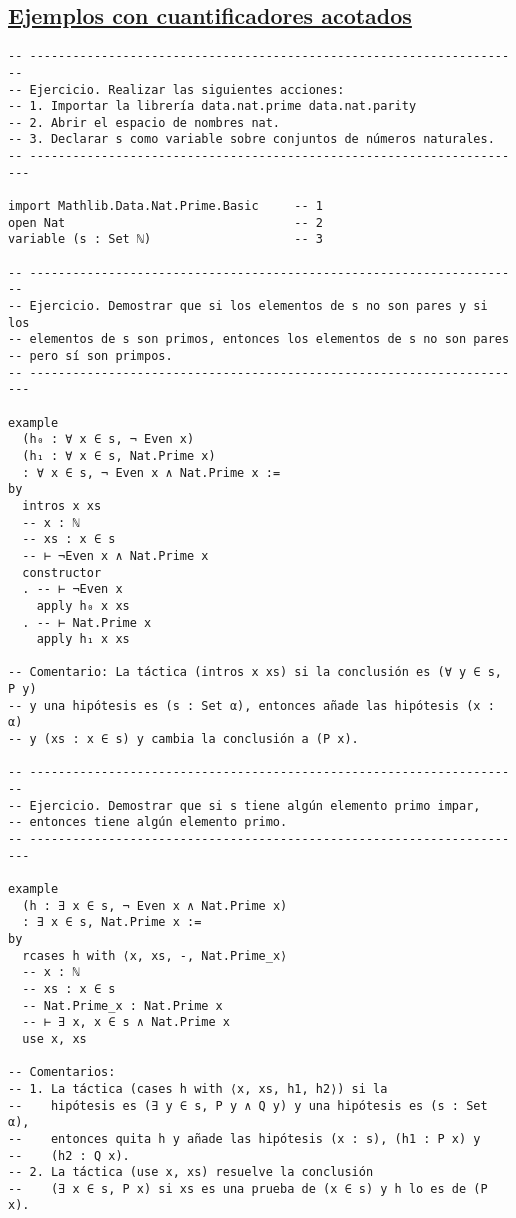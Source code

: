 \subsection{\href{./src/Conjuntos/Ejemplos\_con\_cuantificadores\_acotados.lean}{Ejemplos con cuantificadores acotados}}
\label{sec:org1ac78ed}
\begin{verbatim}
-- ---------------------------------------------------------------------
-- Ejercicio. Realizar las siguientes acciones:
-- 1. Importar la librería data.nat.prime data.nat.parity
-- 2. Abrir el espacio de nombres nat.
-- 3. Declarar s como variable sobre conjuntos de números naturales.
-- ----------------------------------------------------------------------

import Mathlib.Data.Nat.Prime.Basic     -- 1
open Nat                                -- 2
variable (s : Set ℕ)                    -- 3

-- ---------------------------------------------------------------------
-- Ejercicio. Demostrar que si los elementos de s no son pares y si los
-- elementos de s son primos, entonces los elementos de s no son pares
-- pero sí son primpos.
-- ----------------------------------------------------------------------

example
  (h₀ : ∀ x ∈ s, ¬ Even x)
  (h₁ : ∀ x ∈ s, Nat.Prime x)
  : ∀ x ∈ s, ¬ Even x ∧ Nat.Prime x :=
by
  intros x xs
  -- x : ℕ
  -- xs : x ∈ s
  -- ⊢ ¬Even x ∧ Nat.Prime x
  constructor
  . -- ⊢ ¬Even x
    apply h₀ x xs
  . -- ⊢ Nat.Prime x
    apply h₁ x xs

-- Comentario: La táctica (intros x xs) si la conclusión es (∀ y ∈ s, P y)
-- y una hipótesis es (s : Set α), entonces añade las hipótesis (x : α)
-- y (xs : x ∈ s) y cambia la conclusión a (P x).

-- ---------------------------------------------------------------------
-- Ejercicio. Demostrar que si s tiene algún elemento primo impar,
-- entonces tiene algún elemento primo.
-- ----------------------------------------------------------------------

example
  (h : ∃ x ∈ s, ¬ Even x ∧ Nat.Prime x)
  : ∃ x ∈ s, Nat.Prime x :=
by
  rcases h with ⟨x, xs, -, Nat.Prime_x⟩
  -- x : ℕ
  -- xs : x ∈ s
  -- Nat.Prime_x : Nat.Prime x
  -- ⊢ ∃ x, x ∈ s ∧ Nat.Prime x
  use x, xs

-- Comentarios:
-- 1. La táctica (cases h with ⟨x, xs, h1, h2⟩) si la
--    hipótesis es (∃ y ∈ s, P y ∧ Q y) y una hipótesis es (s : Set α),
--    entonces quita h y añade las hipótesis (x : s), (h1 : P x) y
--    (h2 : Q x).
-- 2. La táctica (use x, xs) resuelve la conclusión
--    (∃ x ∈ s, P x) si xs es una prueba de (x ∈ s) y h lo es de (P x).
\end{verbatim}

